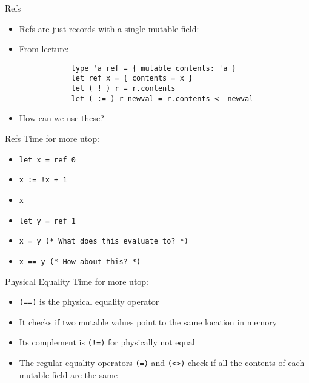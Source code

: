 \documentclass{beamer}
\begin{document}
    \begin{frame}[fragile=singleslide]{Refs}
        \begin{itemize}
            \item Refs are just records with a single mutable field:
            \item From lecture:
            \begin{verbatim}
            type 'a ref = { mutable contents: 'a }
            let ref x = { contents = x }
            let ( ! ) r = r.contents
            let ( := ) r newval = r.contents <- newval
            \end{verbatim}
            \item How can we use these?
        \end{itemize}
    \end{frame}

    \begin{frame}[fragile=singleslide]{Refs}
        Time for more utop:
        \begin{itemize}
            \item \texttt{let x = ref 0}
            \item \texttt{x := !x + 1}
            \item \texttt{x}
            \item \texttt{let y = ref 1}
            \item \texttt{x = y (* What does this evaluate to? *)}
            \item \texttt{x == y (* How about this? *)}
        \end{itemize}
    \end{frame}

    \begin{frame}{Physical Equality}
        Time for more utop:
        \begin{itemize}
            \item \texttt{(==)} is the physical equality operator
            \pause
            \item It checks if two mutable values point to the same location in memory
            \pause
            \item Its complement is \texttt{(!=)} for physically not equal
            \pause
            \item The regular equality operators \texttt{(=)} and 
                \texttt{(<>)} check if all the contents of each mutable 
                field are the same
            \pause
        \end{itemize}
    \end{frame}
\end{document}
